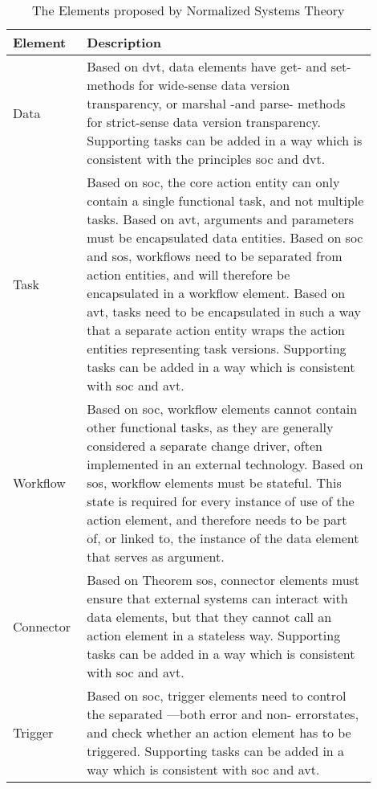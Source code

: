 \begin{table}[H]
    \begin{tabular}{ p{0.15\linewidth} p{0.75\linewidth}}
        \hline
        \textbf{Element} & \textbf{Description} \\ 
        \hline
        Data & Based on \gls{dvt}, data elements have get- and set-methods for wide-sense
        data version transparency, or marshal -and parse- methods for strict-sense data
        version transparency. Supporting tasks can be added in a way which is consistent
        with the principles \gls{soc} and \gls{dvt}.\\
        \midrule

        Task & Based on \gls{soc}, the core action entity can only contain a single
        functional task, and not multiple tasks. Based on \gls{avt}, arguments and
        parameters must be encapsulated data entities. Based on \gls{soc} and \gls{sos},
        workflows need to be separated from action entities, and will therefore be
        encapsulated in a workflow element. Based on \gls{avt}, tasks need to be
        encapsulated in such a way that a separate action entity wraps the action entities
        representing task versions. Supporting tasks can be added in a way which is
        consistent with \gls{soc} and \gls{avt}.\\
        \midrule

        Workflow & Based on \gls{soc}, workflow elements cannot contain other functional
        tasks, as they are generally considered a separate change driver, often
        implemented in an external technology. Based on \gls{sos}, workflow elements must
        be stateful. This state is required for every instance of use of the action
        element, and therefore needs to be part of, or linked to, the instance of the data
        element that serves as argument.\\ \midrule

        Connector & Based on Theorem \gls{sos}, connector elements must ensure that
        external systems can interact with data elements, but that they cannot call an
        action element in a stateless way. Supporting tasks can be added in a way which is
        consistent with \gls{soc} and \gls{avt}.\\ \midrule

        Trigger & Based on \gls{soc}, trigger elements need to control the separated —both
        error and non- errorstates, and check whether an action element has to be
        triggered. Supporting tasks can be added in a way which is consistent with
        \gls{soc} and \gls{avt}.\\

        \bottomrule
    \end{tabular}
    \caption{The Elements proposed by Normalized Systems Theory}
    \label{ns_element}
\end{table}
